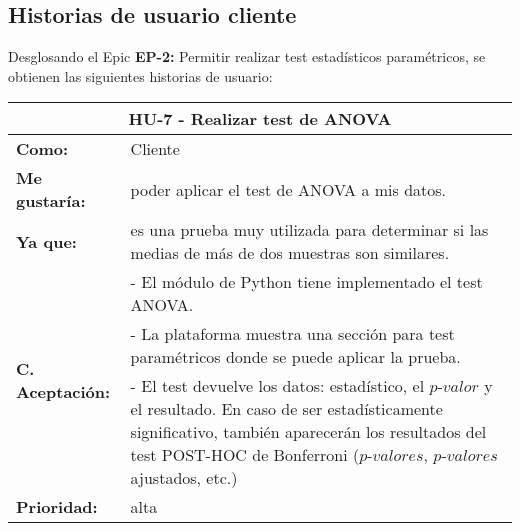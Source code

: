 \subsection{Historias de usuario cliente} \label{hu_cliente}


Desglosando el Epic \textbf{EP-2:} Permitir realizar test estadísticos paramétricos, se obtienen las siguientes historias de usuario:

\begin{table}[H]
	\begin{tabular}{| p{3cm}| p{11cm} |}
		\hline
		\multicolumn{2}{|c|}{\textbf{HU-7} - Realizar test de ANOVA} \\ \hline
		\textbf{Como:} & Cliente \\ \hline
		\textbf{Me gustaría:} & poder aplicar el test de ANOVA a mis datos. \\ \hline
		\textbf{Ya que:} & es una prueba muy utilizada para determinar si las medias de más de dos muestras son similares. \\ \hline
		\multirow{3}{11cm}{\textbf{C. Aceptación:}} & - El módulo de Python tiene implementado el test ANOVA. \\
		& - La plataforma muestra una sección para test paramétricos donde se puede aplicar la prueba. \\
		& - El test devuelve los datos: estadístico, el $\textit{p-valor}$ y el resultado. En caso de ser estadísticamente significativo, también aparecerán los resultados del test POST-HOC de Bonferroni ($\textit{p-valores}$, $\textit{p-valores}$ ajustados, etc.) \\ \hline
		\textbf{\textbf{Prioridad:}} & alta \\ \hline
	\end{tabular}
\end{table}


